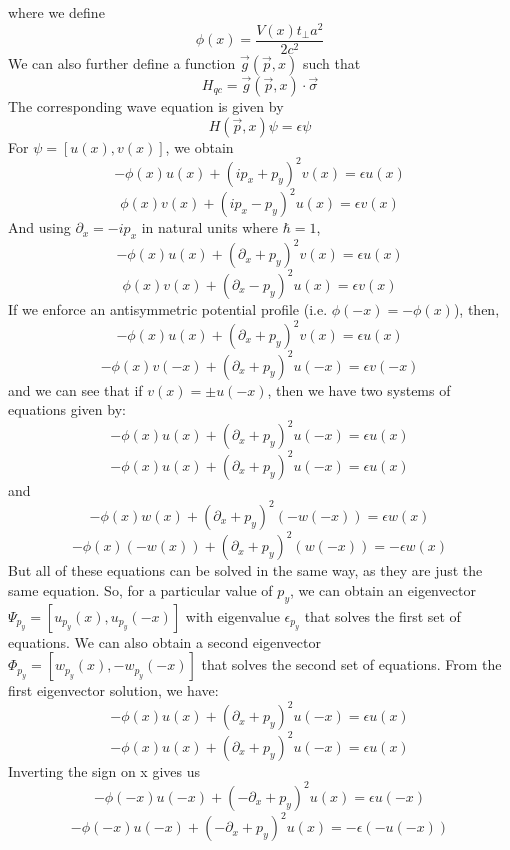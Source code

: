 \documentclass{article}
\begin{document}
where we define
$$
\phi(x) = \frac{V(x)t_{\perp}a^{2}}{2c^{2}}
$$
We can also further define a function $\vec{g}(\vec{p}, x)$ such that
\begin{equation}
H_{qc} = \vec{g}(\vec{p}, x)\cdot\vec{\sigma}
\end{equation}
The corresponding wave equation is given by
\begin{equation}
H(\vec{p}, x)\psi = \epsilon\psi
\end{equation}
For $\psi = [u(x), v(x)]$, we obtain
$$
-\phi(x)u(x) + (ip_{x} + p_{y})^{2}v(x) = \epsilon u(x)
$$
\begin{equation}
\phi(x)v(x) + (ip_{x} - p_{y})^{2}u(x) = \epsilon v(x)
\end{equation}
And using $\partial_{x} = -ip_{x}$ in natural units where $\hbar = 1$,
$$
-\phi(x)u(x) + (\partial_{x} + p_{y})^{2}v(x) = \epsilon u(x)
$$
\begin{equation}
\phi(x)v(x) + (\partial_{x} - p_{y})^{2}u(x) = \epsilon v(x)
\end{equation}
If we enforce an antisymmetric potential profile (i.e. $\phi(-x) = -\phi(x)$), then,
$$
-\phi(x)u(x) + (\partial_{x} + p_{y})^{2}v(x) = \epsilon u(x)
$$
\begin{equation}
-\phi(x)v(-x) + (\partial_{x} + p_{y})^{2}u(-x) = \epsilon v(-x)
\end{equation}
and we can see that if $v(x) = \pm u(-x)$, then we have two systems of equations given by:
$$
-\phi(x)u(x) + (\partial_{x} + p_{y})^{2}u(-x) = \epsilon u(x)
$$
$$
-\phi(x)u(x) + (\partial_{x} + p_{y})^{2}u(-x) = \epsilon u(x)
$$
and
$$
-\phi(x)w(x) + (\partial_{x} + p_{y})^{2}(-w(-x)) = \epsilon w(x)
$$
$$
-\phi(x)(-w(x)) + (\partial_{x} + p_{y})^{2}(w(-x)) = -\epsilon w(x)
$$
But all of these equations can be solved in the same way, as they are just the same equation. So, for a particular value
of $p_{y}$, we can obtain an eigenvector $\Psi_{p_{y}} = [u_{p_{y}}(x), u_{p_{y}}(-x)]$ with eigenvalue $\epsilon_{p_{y}}$
that solves the first set of equations.
We can also obtain a second eigenvector $\Phi_{p_{y}} = [w_{p_{y}}(x), -w_{p_{y}}(-x)]$ that solves the second set of
equations. From the first eigenvector solution, we have:
$$
-\phi(x)u(x) + (\partial_{x} + p_{y})^{2}u(-x) = \epsilon u(x)
$$
$$
-\phi(x)u(x) + (\partial_{x} + p_{y})^{2}u(-x) = \epsilon u(x)
$$
Inverting the sign on x gives us
$$
-\phi(-x)u(-x) + (-\partial_{x} + p_{y})^{2}u(x) = \epsilon u(-x)
$$
$$
-\phi(-x)u(-x) + (-\partial_{x} + p_{y})^{2}u(x) = -\epsilon(-u(-x))
$$
\end{document}
